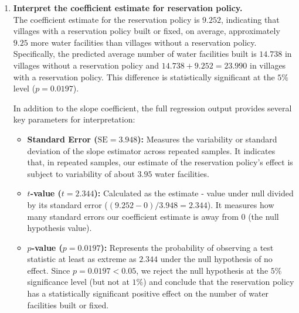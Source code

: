 \documentclass[12pt,letterpaper]{article}
\begin{document}
\begin{enumerate}
\begin{verbatim}
		Residuals:
		Min      1Q  Median      3Q     Max 
		-23.991 -14.738  -7.865   2.262 316.009 
		
		Coefficients:
		Estimate Std. Error t value Pr(>|t|)    
		(Intercept)   14.738      2.286   6.446 4.22e-10 ***
		reserved       9.252      3.948   2.344   0.0197 *  
		---
		Signif. codes:  0 ‘***’ 0.001 ‘**’ 0.01 ‘*’ 0.05 ‘.’ 0.1 ‘ ’ 1
		
		Residual standard error: 33.45 on 320 degrees of freedom
		Multiple R-squared:  0.01688,	Adjusted R-squared:  0.0138 
		F-statistic: 5.493 on 1 and 320 DF,  p-value: 0.0197
	\end{verbatim}
	
	\vspace{.5cm}
	\item [(c)] \textbf{Interpret the coefficient estimate for reservation policy.}\\
	
	\noindent The coefficient estimate for the reservation policy is $9.252$, indicating that villages with a reservation policy built or fixed, on average, approximately $9.25$ more water facilities than villages without a reservation policy. Specifically, the predicted average number of water facilities built is $14.738$ in villages without a reservation policy and $14.738 + 9.252 = 23.990$ in villages with a reservation policy. This difference is statistically significant at the $5\%$ level ($p = 0.0197$).
	
	\noindent In addition to the slope coefficient, the full regression output provides several key parameters for interpretation:
	\begin{itemize}
		\item \textbf{Standard Error ($\text{SE} = 3.948$):} Measures the variability or standard deviation of the slope estimator across repeated samples. It indicates that, in repeated samples, our estimate of the reservation policy's effect is subject to variability of about $3.95$ water facilities.
		\item \textbf{$t$-value ($t = 2.344$):} Calculated as the estimate - value under null divided by its standard error ($(9.252 - 0) / 3.948 = 2.344$). It measures how many standard errors our coefficient estimate is away from $0$ (the null hypothesis value).
		\item \textbf{$p$-value ($p = 0.0197$):} Represents the probability of observing a test statistic at least as extreme as $2.344$ under the null hypothesis of no effect. Since $p = 0.0197 < 0.05$, we reject the null hypothesis at the $5\%$ significance level (but not at $1\%$) and conclude that the reservation policy has a statistically significant positive effect on the number of water facilities built or fixed.
	\end{itemize}
	
\end{enumerate}
\end{document}
